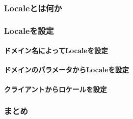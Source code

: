 \subsubsection{Localeとは何か}

\subsubsection{Localeを設定}

\paragraph{ドメイン名によってLocaleを設定}

\paragraph{ドメインのパラメータからLocaleを設定}

\paragraph{クライアントからロケールを設定}

\subsubsection{まとめ}

